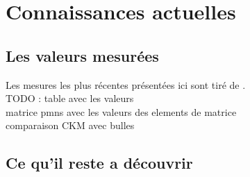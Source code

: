 
    \section{Connaissances actuelles}
    
	    \subsection{Les valeurs mesurées}\label{sec::measured_pmns}
	         Les mesures les plus récentes présentées ici sont tiré de \cite{pdg2018}.\\
	         TODO : table avec les valeurs\\
	         matrice pmns avec les valeurs des elements de matrice\\
	         comparaison CKM avec bulles\\
	         
	     \subsection{Ce qu'il reste a découvrir}
